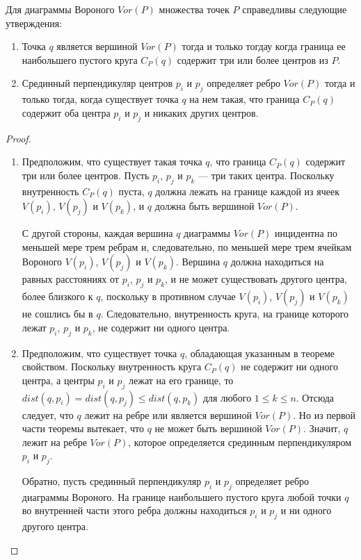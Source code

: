 \begin{theorem}
    Для  диаграммы  Вороного  $Vor(P)$  множества  точек  $P$  справедливы следующие  утверждения:

    \begin{enumerate}
        \item Точка  $q$  является  вершиной  $Vor(P)$  тогда  и  только  тогдау  когда  граница  ее наибольшего  пустого  круга  $C_P(q)$  содержит  три  или  более  центров  из  $P$.
        \item Срединный  перпендикуляр  центров  $p_i$  и  $p_j$  определяет  ребро  $Vor(P)$  тогда  и только  тогда,  когда  существует  точка  $q$  на  нем  такая,  что  граница  $C_P(q)$ содержит  оба  центра  $p_i$  и  $p_j$  и  никаких  других  центров.
    \end{enumerate}
\end{theorem}

\begin{proof}
    \begin{enumerate}
        \item Предположим,  что  существует  такая  точка  $q$,  что  граница $C_P(q)$  содержит  три  или  более  центров.
        Пусть  $p_i$,  $p_j$  и  $p_k$ ---  три  таких  центра.
        Поскольку  внутренность  $C_P(q)$  пуста,  $q$  должна  лежать  на  границе  каждой  из  ячеек  $V(p_i)$,  $V(p_j)$  и  $V(p_k)$,  и  $q$  должна  быть  вершиной  $Vor(P)$.

        С  другой  стороны,  каждая  вершина  $q$  диаграммы $Vor(P)$  инцидентна  по  меньшей  мере  трем  ребрам  и,  следовательно,  по  меньшей  мере  трем  ячейкам  Вороного $V(p_i)$,  $V(p_j)$  и  $V(p_k)$. 
        Вершина  $q$  должна  находиться  на  равных  расстояниях  от  $p_i$,  $p_j$  и  $p_k$,  и  не  может  существовать другого  центра,  более  близкого  к  $q$,  поскольку  в  противном  случае  $V(p_i)$,  $V(p_j)$  и  $V(p_k)$  не  сошлись  бы  в  $q$.
        Следовательно,  внутренность  круга,  на  границе  которого  лежат $p_i$,  $p_j$  и  $p_k$,  не  содержит  ни  одного  центра.

        \item Предположим,  что  существует  точка  $q$,  обладающая  указанным  в  теореме свойством.
        Поскольку  внутренность  круга  $C_P(q)$  не  содержит  ни  одного  центра,  а центры  $p_i$  и  $p_j$  лежат  на  его  границе,  то  $dist(q, p_i)  =  dist(q, p_j) \le dist(q,  p_k)$  для  любого $1 \le k \le n$.
        Отсюда  следует,  что  $q$  лежит  на  ребре  или  является  вершиной  $Vor(P)$.
        Но из  первой  части  теоремы  вытекает,  что  $q$  не  может  быть  вершиной  $Vor(P)$.
        Значит,  $q$ лежит  на  ребре  $Vor(P)$,  которое  определяется  срединным  перпендикуляром $p_i$ и $p_j$.

        Обратно,  пусть  срединный  перпендикуляр  $p_i$ и $p_j$ определяет  ребро  диаграммы Вороного.
        На  границе  наибольшего  пустого  круга  любой  точки  $q$  во  внутренней части  этого  ребра  должны  находиться $p_i$ и $p_j$ и  ни  одного  другого  центра.
    \end{enumerate}
\end{proof}

